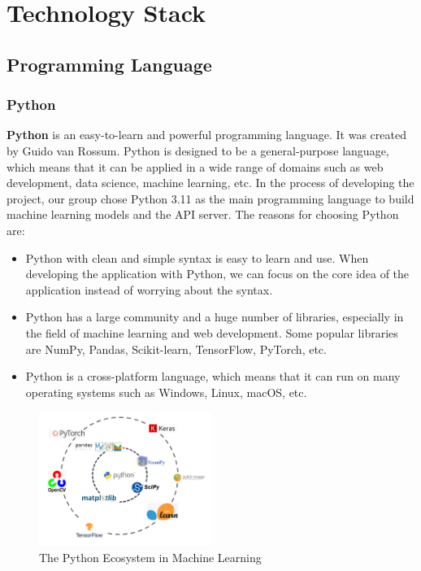 \chapter{Technology Stack}

\section{Programming Language}

\subsection{Python}
\textbf{Python} is an easy-to-learn and powerful programming language. It was created by Guido van Rossum. Python is designed to be a general-purpose language, which means that it can be applied in a wide range of domains such as web development, data science, machine learning, etc. In the process of developing the project, our group chose Python 3.11 as the main programming language to build machine learning models and the API server. The reasons for choosing Python are:
\begin{itemize}
    \item Python with clean and simple syntax is easy to learn and use. When developing the application with Python, we can focus on the core idea of the application instead of worrying about the syntax.
    \item Python has a large community and a huge number of libraries, especially in the field of machine learning and web development. Some popular libraries are NumPy, Pandas, Scikit-learn, TensorFlow, PyTorch, etc.
    \item Python is a cross-platform language, which means that it can run on many operating systems such as Windows, Linux, macOS, etc.
\end{itemize}

\begin{figure}[ht]
    \centering
    \includegraphics[width=0.5\textwidth]{../Images/8.Technology_Stack/python_ecosystem.png}
    \caption{The Python Ecosystem in Machine Learning}
    \label{fig:python_ecosystem}
\end{figure}

